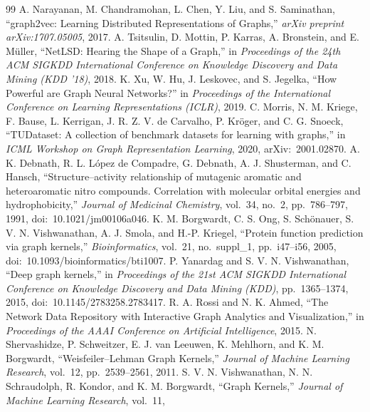 \begin{thebibliography}{99}
A. Narayanan, M. Chandramohan, L. Chen, Y. Liu, and S. Saminathan,
``graph2vec: Learning Distributed Representations of Graphs,''
\emph{arXiv preprint arXiv:1707.05005}, 2017.
A. Tsitsulin, D. Mottin, P. Karras, A. Bronstein, and E. M{\"u}ller,
``NetLSD: Hearing the Shape of a Graph,''
in \emph{Proceedings of the 24th ACM SIGKDD International Conference on
Knowledge Discovery and Data Mining (KDD '18)},
2018.
K. Xu, W. Hu, J. Leskovec, and S. Jegelka,
``How Powerful are Graph Neural Networks?''
in \emph{Proceedings of the International Conference on Learning Representations (ICLR)},
2019.
C. Morris, N. M. Kriege, F. Bause, L. Kerrigan, J. R. Z. V. de Carvalho,
P. Kr{\"o}ger, and C. G. Snoeck,
``TUDataset: A collection of benchmark datasets for learning with graphs,''
in \emph{ICML Workshop on Graph Representation Learning}, 2020,
arXiv:~2001.02870.
A. K. Debnath, R. L. L{\'o}pez de Compadre, G. Debnath, A. J. Shusterman,
and C. Hansch,
``Structure--activity relationship of mutagenic aromatic and heteroaromatic nitro
compounds. Correlation with molecular orbital energies and hydrophobicity,''
\emph{Journal of Medicinal Chemistry}, vol.~34, no.~2, pp.~786--797, 1991,
doi:~10.1021/jm00106a046.
K. M. Borgwardt, C. S. Ong, S. Sch{\"o}nauer, S. V. N. Vishwanathan,
A. J. Smola, and H.-P. Kriegel,
``Protein function prediction via graph kernels,''
\emph{Bioinformatics}, vol.~21, no.~suppl\_1, pp.~i47--i56, 2005,
doi:~10.1093/bioinformatics/bti1007.
P. Yanardag and S. V. N. Vishwanathan,
``Deep graph kernels,''
in \emph{Proceedings of the 21st ACM SIGKDD International Conference on Knowledge Discovery and Data Mining (KDD)},
pp.~1365--1374, 2015,
doi:~10.1145/2783258.2783417.
R. A. Rossi and N. K. Ahmed,
``The Network Data Repository with Interactive Graph Analytics and Visualization,''
in \emph{Proceedings of the AAAI Conference on Artificial Intelligence},
2015.
N. Shervashidze, P. Schweitzer, E. J. van Leeuwen, K. Mehlhorn,
and K. M. Borgwardt,
``Weisfeiler--Lehman Graph Kernels,''
\emph{Journal of Machine Learning Research}, vol.~12,
pp.~2539--2561, 2011.
S. V. N. Vishwanathan, N. N. Schraudolph, R. Kondor,
and K. M. Borgwardt,
``Graph Kernels,''
\emph{Journal of Machine Learning Research}, vol.~11,

\end{thebibliography}
